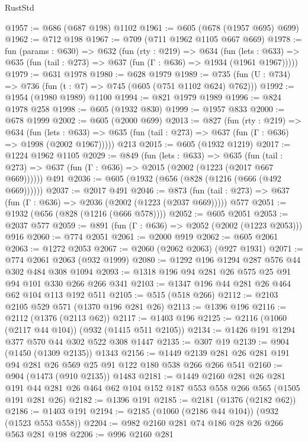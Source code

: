 \begin{lexlean}{RustStd}
\begin{coremodule}
@1957 := @686 (@687 @198) @1102
@1961 := @605 (@678 (@1957 @695) @699)
@1962 := @712 @198
@1967 := @709 (@711 @1962 @1105 @667 @669)
@1978 := fun (params : @630) =>
  @632
    (fun (rty : @219) =>
    @634
      (fun (lets : @633) =>
      @635 (fun (tail : @273) => @637 (fun (Γ : @636) => @1934 (@1961 @1967)))))
@1979 := @631 @1978
@1980 := @628 @1979
@1989 := @735 (fun (U : @734) => @736 (fun (t : @7) => @745 (@605 (@751 @1102 @624) @762)))
@1992 := @1954 (@1980 @1989) @1100
@1994 := @821 @1979 @1989
@1996 := @824 @1978 @258
@1998 := @605 (@1932 @830)
@1999 := @1957 @833
@2000 := @678 @1999
@2002 := @605 (@2000 @699)
@2013 := @827
    (fun (rty : @219) =>
    @634
      (fun (lets : @633) =>
      @635 (fun (tail : @273) => @637 (fun (Γ : @636) => @1998 (@2002 @1967)))))
    @213
@2015 := @605 (@1932 @1219)
@2017 := @1224 @1962 @1105
@2029 := @849
    (fun (lets : @633) =>
    @635 (fun (tail : @273) => @637 (fun (Γ : @636) => @2015 (@2002 (@1223 (@2017 @667 @669))))))
    @491
@2036 := @605 (@1932 (@656 (@828 (@1216 (@666 (@492 @669))))))
@2037 := @2017 @491
@2046 := @873
    (fun (tail : @273) => @637 (fun (Γ : @636) => @2036 (@2002 (@1223 (@2037 @669)))))
    @577
@2051 := @1932 (@656 (@828 (@1216 (@666 @578))))
@2052 := @605 @2051
@2053 := @2037 @577
@2059 := @891 (fun (Γ : @636) => @2052 (@2002 (@1223 @2053))) @916
@2060 := @774 @2051
@2061 := @2000 @919
@2062 := @605 @2061
@2063 := @1272 @2053
@2067 := @2060 (@2062 @2063) (@927 @1931)
@2071 := @774 @2061 @2063 (@932 @1999)
@2080 := @1292 @196 @1294 @287 @576 @44 @302 @484 @308 @1094
@2093 := @1318 @196 @94 @281 @26 @575 @25 @91 @94 @101 @330 @266 @266 @341
@2103 := @1347 @196 @44 @281 @26 @464 @62 @104 @113 @192 @511
@2105 := @515 (@518 @266)
@2112 := @2103 @2105 @529 @571 (@1370 @196 @281 @26)
@2113 := @1396 @196
@2116 := @2112 (@1376 (@2113 @62))
@2117 := @1403 @196
@2125 := @2116 (@1060 (@2117 @44 @104)) (@932 (@1415 @511 @2105))
@2134 := @1426 @191 @1294 @377 @570 @44 @302 @522 @308 @1447
@2135 := @307 @19
@2139 := @904 (@1450 (@1309 @2135)) @1343
@2156 := @1449 @2139 @281 @26 @281 @191 @94 @281 @26 @569 @25 @91 @122 @180 @538 @266 @266 @541
@2160 := @904 (@1473 (@910 @2135)) @1483
@2181 := @1449
    @2160
    @281
    @26
    @281
    @191
    @44
    @281
    @26
    @464
    @62
    @104
    @152
    @187
    @553
    @558
    @266
    @565
    (@1505 @191 @281 @26)
@2182 := @1396 @191
@2185 := @2181 (@1376 (@2182 @62))
@2186 := @1403 @191
@2194 := @2185 (@1060 (@2186 @44 @104)) (@932 (@1523 @553 @558))
@2204 := @982 @2160 @281 @74 @186 @28 @26 @266 @563 @281 @198
@2206 := @996 @2160 @281

\end{coremodule}
\end{lexlean}
